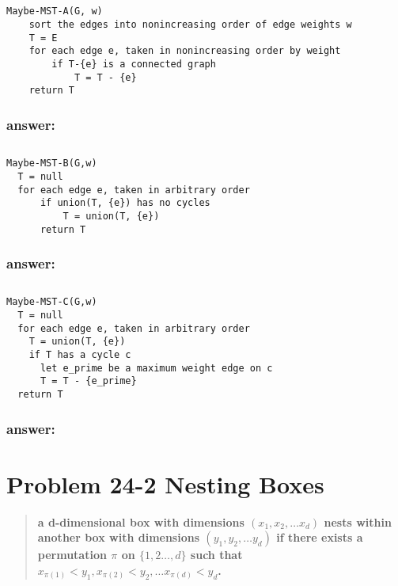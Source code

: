 \documentclass[titlepage]{article}\usepackage[]{graphicx}\usepackage[]{color}
\theoremstyle{definition}
\begin{document}
\subsection{}
\begin{lstlisting}
Maybe-MST-A(G, w)
	sort the edges into nonincreasing order of edge weights w
	T = E
	for each edge e, taken in nonincreasing order by weight
		if T-{e} is a connected graph
			T = T - {e}
	return T
\end{lstlisting}
\subsubsection{answer: }
\vspace{8cm}




\subsection{}
\begin{lstlisting}
Maybe-MST-B(G,w)
  T = null
  for each edge e, taken in arbitrary order
	  if union(T, {e}) has no cycles
		  T = union(T, {e})
	  return T
\end{lstlisting}
\subsubsection{answer: }

\vspace{8cm}


\subsection{}
\begin{lstlisting}
Maybe-MST-C(G,w)
  T = null
  for each edge e, taken in arbitrary order
	T = union(T, {e})
	if T has a cycle c
	  let e_prime be a maximum weight edge on c
	  T = T - {e_prime}
  return T
\end{lstlisting}
\subsubsection{answer:}

\vspace{8cm}

\section{Problem 24-2 Nesting Boxes}
\begin{quote}
  \textbf{a d-dimensional box with dimensions $(x_1, x_2, \dots x_d)$
	\textbf{nests} within another box with dimensions $(y_1, y_2, \dots y_d)$
	if there exists a permutation $\pi$ on $\{1,2\dots,d\}$ such that 
	$ x_{\pi(1)} < y_1, x_{\pi(2)} < y_2, \dots x_{\pi(d)} < y_d$.  }
\end{quote}
\end{document}
